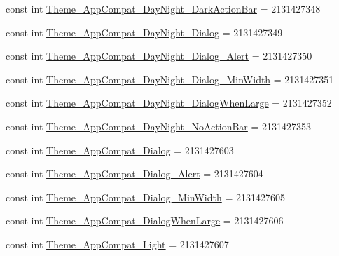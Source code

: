 \begin{DoxyCompactItemize}
\item 
const int \mbox{\hyperlink{class_f_w_p_s___app_1_1_droid_1_1_resource_1_1_style_afee00f90a423c8c77d45d725f76638e2}{Theme\+\_\+\+App\+Compat\+\_\+\+Day\+Night\+\_\+\+Dark\+Action\+Bar}} = 2131427348
\item 
const int \mbox{\hyperlink{class_f_w_p_s___app_1_1_droid_1_1_resource_1_1_style_ac1f689a624206f4e30d2d390d60b5347}{Theme\+\_\+\+App\+Compat\+\_\+\+Day\+Night\+\_\+\+Dialog}} = 2131427349
\item 
const int \mbox{\hyperlink{class_f_w_p_s___app_1_1_droid_1_1_resource_1_1_style_af12fccbea98ef78cdd4ff2c6989cda10}{Theme\+\_\+\+App\+Compat\+\_\+\+Day\+Night\+\_\+\+Dialog\+\_\+\+Alert}} = 2131427350
\item 
const int \mbox{\hyperlink{class_f_w_p_s___app_1_1_droid_1_1_resource_1_1_style_a2dfdb8618dfbb4dfa7e3bf6ea1cec5e1}{Theme\+\_\+\+App\+Compat\+\_\+\+Day\+Night\+\_\+\+Dialog\+\_\+\+Min\+Width}} = 2131427351
\item 
const int \mbox{\hyperlink{class_f_w_p_s___app_1_1_droid_1_1_resource_1_1_style_ab187e4c64938d35b62a5e2c4c0d0b7c8}{Theme\+\_\+\+App\+Compat\+\_\+\+Day\+Night\+\_\+\+Dialog\+When\+Large}} = 2131427352
\item 
const int \mbox{\hyperlink{class_f_w_p_s___app_1_1_droid_1_1_resource_1_1_style_a7280a8a80ca07c37bac22d33f97a289e}{Theme\+\_\+\+App\+Compat\+\_\+\+Day\+Night\+\_\+\+No\+Action\+Bar}} = 2131427353
\item 
const int \mbox{\hyperlink{class_f_w_p_s___app_1_1_droid_1_1_resource_1_1_style_a432b787f0e896dd1cee8813625a188ba}{Theme\+\_\+\+App\+Compat\+\_\+\+Dialog}} = 2131427603
\item 
const int \mbox{\hyperlink{class_f_w_p_s___app_1_1_droid_1_1_resource_1_1_style_a7d2e1933d2b44a1aaa3cf5b4965e9240}{Theme\+\_\+\+App\+Compat\+\_\+\+Dialog\+\_\+\+Alert}} = 2131427604
\item 
const int \mbox{\hyperlink{class_f_w_p_s___app_1_1_droid_1_1_resource_1_1_style_a6d16e32314be406fe293784fc9814760}{Theme\+\_\+\+App\+Compat\+\_\+\+Dialog\+\_\+\+Min\+Width}} = 2131427605
\item 
const int \mbox{\hyperlink{class_f_w_p_s___app_1_1_droid_1_1_resource_1_1_style_aee1990ed41eecb7790e2b03bc7fb350e}{Theme\+\_\+\+App\+Compat\+\_\+\+Dialog\+When\+Large}} = 2131427606
\item 
const int \mbox{\hyperlink{class_f_w_p_s___app_1_1_droid_1_1_resource_1_1_style_a8edf314a437d7b80d2a58b1cb24daf70}{Theme\+\_\+\+App\+Compat\+\_\+\+Light}} = 2131427607
\item 

\end{DoxyCompactItemize}
